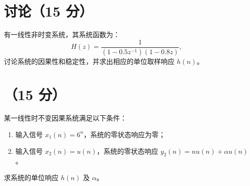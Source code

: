 \documentclass{ctexart}
\theoremstyle{change}
\begin{document}
\section{讨论（15 分）}
有一线性非时变系统，其系统函数为：
\[
	H(z) = \frac{1}{(1 - 0.5 z^{-1}) (1 - 0.8 z)},
\]
讨论系统的因果性和稳定性，并求出相应的单位取样响应 $h(n)$。

\section{（15 分）}
某一线性时不变因果系统满足以下条件：
\begin{enumerate}
	\item 输入信号 $x_{1}(n) = 6^{n}$，系统的零状态响应为零；
	\item 输入信号 $x_{2}(n) = u(n)$，系统的零状态响应 $y_{2}(n) = n u(n) + \alpha u(n)$。
\end{enumerate}
求系统的单位响应 $h(n)$ 及 $\alpha$。
\end{document}

